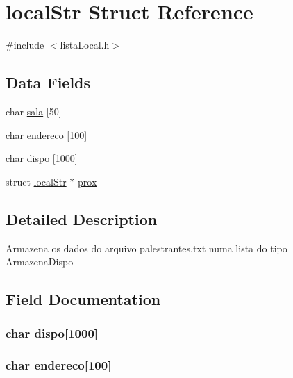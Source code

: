 \hypertarget{structlocal_str}{}\section{local\+Str Struct Reference}
\label{structlocal_str}


{\ttfamily \#include $<$lista\+Local.\+h$>$}

\subsection*{Data Fields}
\begin{DoxyCompactItemize}
\item 
char \hyperlink{structlocal_str_a7609c4270fb3307a06848edee43c1957}{sala} \mbox{[}50\mbox{]}
\item 
char \hyperlink{structlocal_str_a0d6302e50f7d24f08d9bdf8187fecca3}{endereco} \mbox{[}100\mbox{]}
\item 
char \hyperlink{structlocal_str_a0dce433794a7408c33fda01d8f3757b3}{dispo} \mbox{[}1000\mbox{]}
\item 
struct \hyperlink{structlocal_str}{local\+Str} $\ast$ \hyperlink{structlocal_str_a81e40b3db618c3787a8b78834e89145e}{prox}
\end{DoxyCompactItemize}


\subsection{Detailed Description}
Armazena os dados do arquivo \textquotesingle{}palestrantes.\+txt\textquotesingle{} numa lista do tipo \textquotesingle{}Armazena\+Dispo\textquotesingle{} 

\subsection{Field Documentation}
\hypertarget{structlocal_str_a0dce433794a7408c33fda01d8f3757b3}{}
\subsubsection[{dispo}]{\setlength{\rightskip}{0pt plus 5cm}char dispo\mbox{[}1000\mbox{]}}\label{structlocal_str_a0dce433794a7408c33fda01d8f3757b3}
\hypertarget{structlocal_str_a0d6302e50f7d24f08d9bdf8187fecca3}{}
\subsubsection[{endereco}]{\setlength{\rightskip}{0pt plus 5cm}char endereco\mbox{[}100\mbox{]}}\label{structlocal_str_a0d6302e50f7d24f08d9bdf8187fecca3}
\hypertarget{structlocal_str_a81e40b3db618c3787a8b78834e89145e}{}
